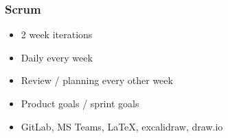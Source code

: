 \begin{frame}
    \frametitle{Scrum}
    \begin{itemize}
        \large
        \item 2 week iterations
        \item Daily every week
        \item Review / planning every other week
        \item Product goals / sprint goals
        \item GitLab, MS Teams, LaTeX, excalidraw, draw.io
    \end{itemize}
\end{frame}